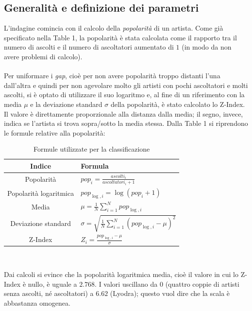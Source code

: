 \documentclass[sigchi]{acmart}
\begin{document}
\subsection{Generalità e definizione dei parametri}

L'indagine comincia con il calcolo della {\itshape popolarità} di un artista. Come già specificato nella Table 1, la popolarità è stata calcolata come il rapporto tra il numero di ascolti e il numero di ascoltatori aumentato di $1$ (in modo da non avere problemi di calcolo). \\ \\ Per uniformare i {\itshape gap}, cioè per non avere popolarità troppo distanti l'una dall'altra e quindi per non agevolare molto gli artisti con pochi ascoltatori e molti ascolti, si è optato di utilizzare il suo logaritmo e, al fine di un riferimento con la media $\mu$ e la deviazione standard $\sigma$ della popolarità, è stato calcolato lo Z-Index. Il valore è direttamente proporzionale alla distanza dalla media; il segno, invece, indica se l'artista si trova sopra/sotto la media stessa. Dalla Table 1 si riprendono le formule relative alla popolarità:

\begin{table}[H]
\centering
\small
\begin{tabular}{|c|>{\centering\arraybackslash}p{4cm}|}
\hline
\textbf{Indice} & \textbf{Formula} \\
\hline
Popolarità &
$pop_i = \frac{ascolti_i}{ascoltatori_i + 1}$ \\
\hline
Popolarità logaritmica &
$pop_{\log,i} = \log(pop_i + 1)$ \\
\hline
Media &
$\mu = \frac{1}{N} \sum_{i=1}^{N} pop_{\log,i}$ \\
\hline
Deviazione standard &
$\sigma = \sqrt{\frac{1}{N} \sum_{i=1}^{N} (pop_{\log,i} - \mu)^2}$ \\
\hline
Z-Index &
$Z_i = \frac{pop_{\log,i} - \mu}{\sigma}$ \\
\hline
\end{tabular}\\[15pt]
\caption{Formule utilizzate per la classificazione}
\end{table}

\noindent Dai calcoli si evince che la popolarità logaritmica media, cioè il valore in cui lo Z-Index è nullo, è uguale a $2.768$. I valori uscillano da $0$ (quattro coppie di artisti senza ascolti, né ascoltatori) a $6.62$ (Lyodra); questo vuol dire che la scala è abbastanza omogenea.
\end{document}
